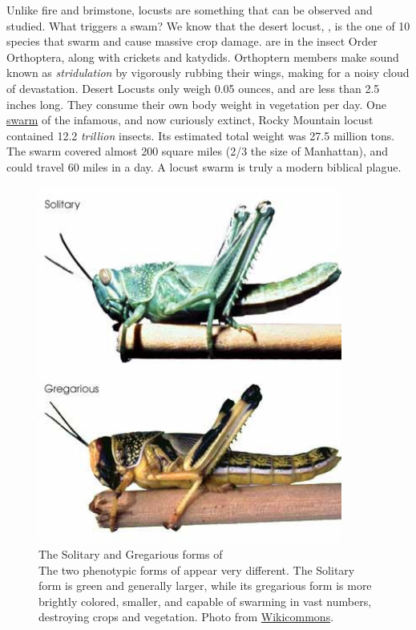   Unlike fire and brimstone, locusts are something that can be observed and studied. What triggers a swam? We know that the desert locust, \locusts{}, is the one of 10 species that swarm and cause massive crop damage. \locusts{} are in the insect Order Orthoptera, along with crickets and katydids. Orthoptern members make sound known as \textit{stridulation} by vigorously rubbing their wings, making for a noisy cloud of devastation. Desert Locusts only weigh 0.05 ounces, and are less than 2.5 inches long. They consume their own body weight in vegetation per day. One \href{http://animaldiversity.ummz.umich.edu/site/accounts/information/Melanoplus_spretus.html}{swarm} of the infamous, and now curiously extinct, Rocky Mountain locust contained 12.2 \textit{trillion} insects. Its estimated total weight was 27.5 million tons. The swarm covered almost 200 square miles (2/3 the size of Manhattan), and could travel 60 miles in a day. A locust swarm is truly a modern biblical plague.

  \begin{figure} %
    \centering 
    \includegraphics[width=10cm,keepaspectratio]{Figures/Intro/DesertLocust.jpeg}
    \caption[The Solitary and Gregarious forms of \locusts{}]
    {
      The Solitary and Gregarious forms of \locusts{}\\[0.25cm]
      The two phenotypic forms of \locusts{} appear very different. The Solitary form is green and generally larger, while its gregarious form is more brightly colored, smaller, and capable of swarming in vast numbers, destroying crops and vegetation. Photo from \href{http://www.wikicommons.com}{Wikicommons}.
      }
    \label{Intro:fig:Locust}
    \end{figure}


